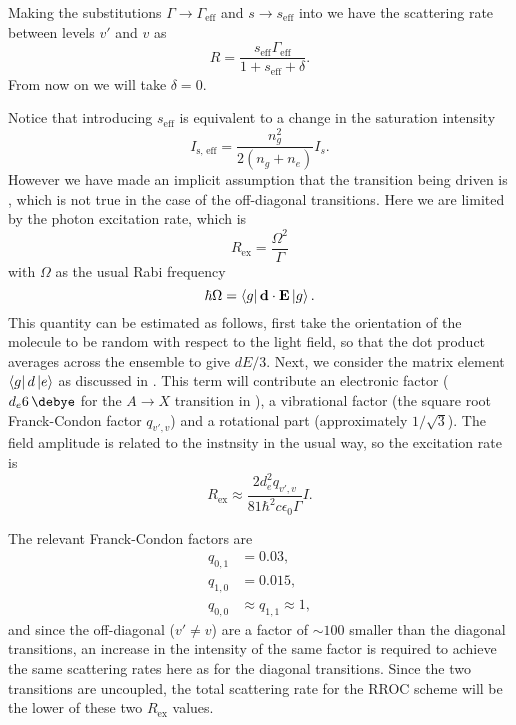 Making the substitutions $\Gamma\rightarrow\Gamma_\text{eff}$ and $s\rightarrow
s_\text{eff}$ into  we have the scattering rate between
levels $v'$ and $v$ as
%
\begin{equation}
  R = \frac{s_\text{eff}\Gamma_\text{eff}}{1 + s_\text{eff} + \delta}.
\end{equation}
%
From now on we will take $\delta = 0$.

Notice that introducing $s_\text{eff}$ is equivalent to a change in the
saturation intensity
%
\begin{equation}
  I_\text{s, eff} = \frac{n_g^2}{2(n_g + n_e)}I_s.
\end{equation}
%
However we have made an implicit assumption that the transition being driven is
, which is not true in the case of the
off-diagonal transitions. Here we are limited by the photon excitation rate,
which is
%
\begin{equation}
  R_\text{ex} = \frac{\Omega^2}{\Gamma}
\end{equation}
%
with $\Omega$ as the usual Rabi frequency
%
\begin{equation}
  \hbar \Omega = \bra{g}\mathbf{d}\cdot\mathbf{E}\ket{g}.
\end{equation}
%
%
This quantity can be estimated as follows, first take the orientation of the
molecule to be random with respect to the light field, so that the dot product
averages across the ensemble to give $dE/3$. Next, we consider the matrix
element $\bra{g}d\ket{e}$ as discussed in .
This term will contribute an electronic factor ($d_e\SI{6}{\debye}$
for the $A\rightarrow X$ transition in \CaF{}), a vibrational factor (the
square root Franck-Condon factor $q_{v',v}$) and a rotational part
(approximately $1/\sqrt{3}$). The field amplitude is related to the instnsity
in the usual way, so the excitation rate is
%
\begin{equation}
  R_\text{ex} \approx \frac{2 d_e^2 q_{v',v}}{81 \hbar^2 c \epsilon_0 \Gamma}I.
\end{equation}

The relevant Franck-Condon factors are
%
\begin{align}
  q_{0,1} &= 0.03,\\
  q_{1,0} &= 0.015,\\
  q_{0,0} &\approx q_{1,1} \approx 1,
\end{align}
%
and since the off-diagonal ($v' \neq v$) are a factor of $\sim100$ smaller than
the diagonal transitions, an increase in the intensity of the same factor is
required to achieve the same scattering rates here as for the diagonal
transitions. Since the two transitions are uncoupled, the total scattering rate
for the RROC scheme will be the lower of these two $R_\text{ex}$ values.

